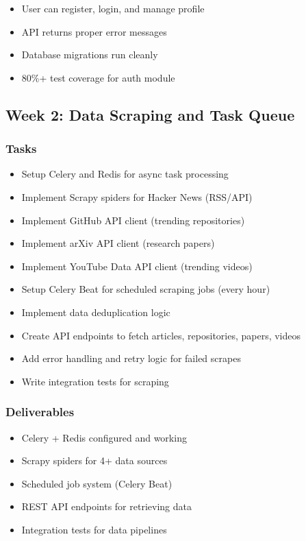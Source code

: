 \documentclass[12pt,oneside]{report}
\begin{document}
\begin{itemize}
    \item User can register, login, and manage profile
    \item API returns proper error messages
    \item Database migrations run cleanly
    \item 80\%+ test coverage for auth module
\end{itemize}

\subsection{Week 2: Data Scraping and Task Queue}

\subsubsection{Tasks}

\begin{itemize}
    \item Setup Celery and Redis for async task processing
    \item Implement Scrapy spiders for Hacker News (RSS/API)
    \item Implement GitHub API client (trending repositories)
    \item Implement arXiv API client (research papers)
    \item Implement YouTube Data API client (trending videos)
    \item Setup Celery Beat for scheduled scraping jobs (every hour)
    \item Implement data deduplication logic
    \item Create API endpoints to fetch articles, repositories, papers, videos
    \item Add error handling and retry logic for failed scrapes
    \item Write integration tests for scraping
\end{itemize}

\subsubsection{Deliverables}

\begin{itemize}
    \item Celery + Redis configured and working
    \item Scrapy spiders for 4+ data sources
    \item Scheduled job system (Celery Beat)
    \item REST API endpoints for retrieving data
    \item Integration tests for data pipelines
\end{itemize}
\end{document}
